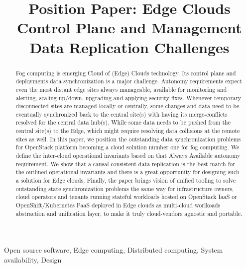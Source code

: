 \documentclass[conference]{IEEEtran}
\begin{document}
\title{Position Paper: Edge Clouds Control Plane and Management Data
Replication Challenges\\
}

\author{
}

\maketitle

\begin{abstract}
Fog computing is emerging Cloud of (Edge) Clouds technology. Its control
plane and deployments data synchronization is a major challenge. Autonomy
requirements expect even the most distant edge sites always manageable,
available for monitoring and alerting, scaling up/down, upgrading and
applying security fixes. Whenever temporary disconnected sites are managed
locally or centrally, some changes and data need to be eventually
synchronized back to the central site(s) with having its merge-conflicts
resolved for the central data hub(s). While some data needs to be pushed from
the central site(s) to the Edge, which might require resolving data
collisions at the remote sites as well. In this paper, we position the
outstanding data synchronization problems for OpenStack platform becoming a
cloud solution number one for fog computing. We define the inter-cloud
operational invariants based on that Always Available autonomy requirement.
We show that a causal consistent data replication is the best match for the
outlined operational invariants and there is a great opportunity for
designing such a solution for Edge clouds. Finally, the paper brings vision
of unified tooling to solve outstanding state synchronization problems the
same way for infrastructure owners, cloud operators and tenants running
stateful workloads hosted on OpenStack IaaS or OpenShift/Kubernetes PaaS
deployed in Edge clouds as multi-cloud worlkoads abstraction and unification
layer, to make it truly cloud-vendors agnostic and portable.
\end{abstract}

\begin{IEEEkeywords}
Open source software, Edge computing, Distributed computing, System
availability, Design
\end{IEEEkeywords}
\end{document}
